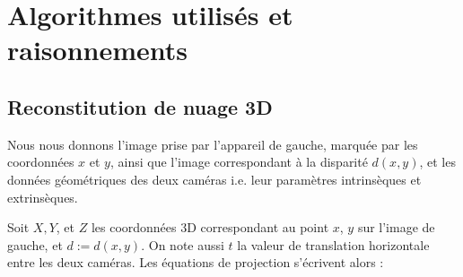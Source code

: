 \documentclass[titlepage,11pt,a4paper]{article}
\begin{document}
\newpage \section{Algorithmes utilisés et raisonnements}
\subsection{Reconstitution de nuage 3D}
\par Nous nous donnons l'image prise par l'appareil de gauche, marquée par les coordonnées $x$ et $y$, ainsi que l'image correspondant à la disparité $d \left( x, y \right)$, et les données géométriques des deux caméras i.e. leur paramètres intrinsèques et extrinsèques. 
\par Soit $X, Y$, et $Z$ les coordonnées 3D correspondant au point $x$, $y$ sur l'image de gauche, et $ d:=d\left(x, y\right)$. On note aussi $t$ la valeur de translation horizontale entre les deux caméras. Les équations de projection s'écrivent alors :
\end{document}
